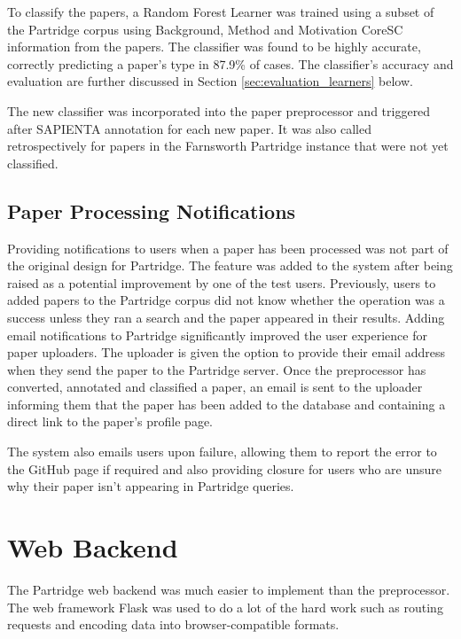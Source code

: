 To classify the papers, a Random Forest Learner was trained using a subset of
the Partridge corpus using Background, Method and Motivation CoreSC information
from the papers. The classifier was found to be highly accurate, correctly
predicting a paper's type in 87.9\% of cases. The classifier's accuracy and
evaluation are further discussed in Section \ref{sec:evaluation_learners}
below. 

The new classifier was incorporated into the paper preprocessor and triggered
after SAPIENTA annotation for each new paper. It was also called
retrospectively for papers in the Farnsworth Partridge instance that were not yet
classified.


\subsection{ Paper Processing Notifications }

Providing notifications to users when a paper has been processed was not part
of the original design for Partridge. The feature was added to the system after
being raised as a potential improvement by one of the test users. Previously,
users to added papers to the Partridge corpus did not know whether the
operation was a success unless they ran a search and the paper appeared in
their results. Adding email notifications to Partridge significantly improved
the user experience for paper uploaders. The uploader is given the option to
provide their email address when they send the paper to the Partridge server.
Once the preprocessor has converted, annotated and classified a paper, an email
is sent to the uploader informing them that the paper has been added to the
database and containing a direct link to the paper's profile page.

The system also emails users upon failure, allowing them to report the error to
the GitHub page if required and also providing closure for users who are unsure
why their paper isn't appearing in Partridge queries.



\section{ Web Backend }
\label{sec:backend}

The Partridge web backend was much easier to implement than the preprocessor.
The web framework Flask was used to do a lot of the hard work such as routing
requests and encoding data into browser-compatible formats.

